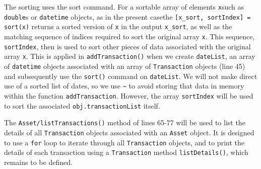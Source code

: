 The sorting uses the sort command. For a sortable array of elements \texttt{x}\textemdash such as \texttt{double}s or \texttt{datetime} objects, as in the present case\textemdash the \verb![x_sort, sortIndex] = sort(x)! returns a sorted version of \verb!x! in the output \verb!x_sort!, as well as the matching sequence of indices required to sort the original array \verb!x!. This sequence, \verb!sortIndex!, then is used to sort other pieces of data associated with the original array \texttt{x}. This is applied in \verb!addTransaction()! when we create \texttt{dateList}, an array of \texttt{datetime} objects associated with an array of \verb!Transaction! objects (line 45) and subsequently use the \texttt{sort()} command on \texttt{dateList}. We will not make direct use of a sorted list of dates, so we use \verb!~! to avoid storing that data in memory within the function \texttt{addTransaction}. However, the array \verb!sortIndex! will be used to sort the associated \verb!obj.transactionList! itself.

The \texttt{Asset/listTransactions()} method of lines 65-77 will be used to list the details of all \texttt{Transaction} objects associated with an \texttt{Asset} object. It is designed to use a \texttt{for} loop to iterate through all \texttt{Transaction} objects, and to print the details of each transaction using a \texttt{Transaction} method \texttt{listDetails()}, which remains to be defined.

